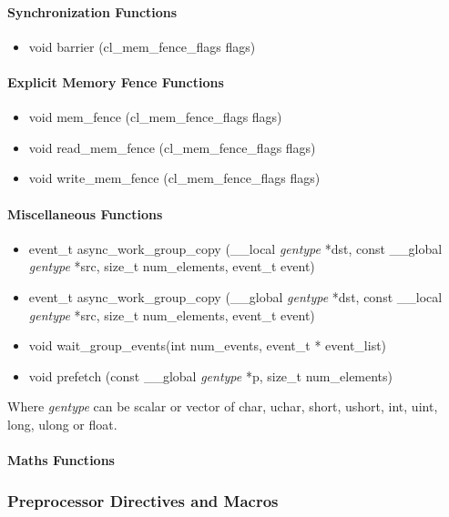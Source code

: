 				\paragraph{Synchronization Functions}
				
\begin{itemize}
	\item void barrier (cl\_mem\_fence\_flags flags)
\end{itemize}
			
				\paragraph{Explicit Memory Fence Functions}
				
\begin{itemize}
	\item void mem\_fence (cl\_mem\_fence\_flags flags)
	\item void read\_mem\_fence (cl\_mem\_fence\_flags flags)
	\item void write\_mem\_fence (cl\_mem\_fence\_flags flags)
\end{itemize}
			
				\paragraph{Miscellaneous Functions}
				
\begin{itemize}
	\item event\_t async\_work\_group\_copy (\_\_local \emph{gentype} *dst, const \_\_global \emph{gentype} *src, size\_t num\_elements, event\_t event)
	\item event\_t async\_work\_group\_copy (\_\_global \emph{gentype} *dst, const \_\_local \emph{gentype} *src, size\_t num\_elements, event\_t event)
	\item void wait\_group\_events(int num\_events, event\_t * event\_list)
	\item void prefetch (const \_\_global \emph{gentype} *p, size\_t num\_elements)
\end{itemize}
Where \emph{gentype} can be scalar or vector of char, uchar, short, ushort, int, uint, long, ulong or float.
				\paragraph{Maths Functions}

			\subsubsection{Preprocessor Directives and Macros}
			

